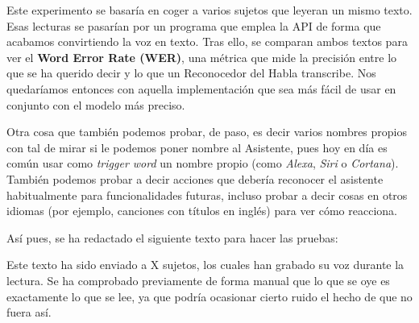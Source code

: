 Este experimento se basaría en coger a varios sujetos que leyeran un mismo texto.
Esas lecturas se pasarían por un programa que emplea la API de forma que acabamos convirtiendo la voz en texto. Tras ello, se comparan ambos textos para ver el \textbf{Word Error Rate (WER)}, una métrica que mide la precisión entre lo que se ha querido decir y lo que un Reconocedor del Habla transcribe. 
Nos quedaríamos entonces con aquella implementación que sea más fácil de usar en conjunto con el modelo más preciso. 

Otra cosa que también podemos probar, de paso, es decir varios nombres propios con tal de mirar si le podemos poner nombre al Asistente, pues hoy en día es común usar como \textit{trigger word} un nombre propio (como \textit{Alexa}, \textit{Siri} o \textit{Cortana}). También podemos probar a decir acciones que debería reconocer el asistente habitualmente para funcionalidades futuras, incluso probar a decir cosas en otros idiomas (por ejemplo, canciones con títulos en inglés) para ver cómo reacciona.

Así pues, se ha redactado el siguiente texto para hacer las pruebas:

\noindent{}

Este texto ha sido enviado a X sujetos, los cuales han grabado su voz durante la lectura. Se ha comprobado previamente de forma manual que lo que se oye es exactamente lo que se lee, ya que podría ocasionar cierto ruido el hecho de que no fuera así.





